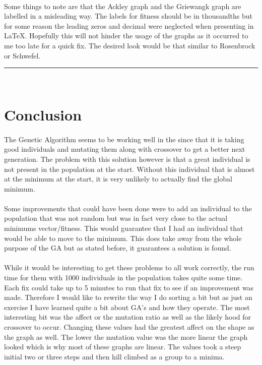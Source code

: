 \documentclass[paper=a4, fontsize=11pt]{scrartcl} %
\numberwithin{equation}{section} %
\numberwithin{figure}{section} %
\numberwithin{table}{section} %
\newcommand{\horrule}[1]{\rule{\linewidth}{#1}} %
\begin{document}
\paragraph{} Some things to note are that the Ackley graph and the Griewangk graph are labelled in a misleading way. The labels for fitness should be in thousandths but for some reason the leading zeros and decimal were neglected when presenting in \LaTeX. Hopefully this will not hinder the usage of the graphs as it occurred to me too late for a quick fix. The desired look would be that similar to Rosenbrock or Schwefel.


\horrule{0.5pt} \\[0.4cm] %
\section{Conclusion}

\paragraph{} The Genetic Algorithm seems to be working well in the since that it is taking good individuals and mutating them along with crossover to get a better next generation. The problem with this solution however is that a great individual is not present in the population at the start. Without this individual that is almost at the minimum at the start, it is very unlikely to actually find the global minimum.

\paragraph{} Some improvements that could have been done were to add an individual to the population that was not random but was in fact very close to the actual minimums vector/fitness. This would guarantee that I had an individual that would be able to move to the minimum. This does take away from the whole purpose of the GA but as stated before, it guarantees a solution is found.

\paragraph{} While it would be interesting to get these problems to all work correctly, the run time for them with 1000 individuals in the population takes quite some time. Each fix could take up to 5 minutes to run that fix to see if an improvement was made. Therefore I would like to rewrite the way I do sorting a bit but as just an exercise I have learned quite a bit about GA's and how they operate. The most interesting bit was the affect or the mutation ratio as well as the likely hood for crossover to occur. Changing these values had the greatest affect on the shape as the graph as well. The lower the mutation value was the more linear the graph looked which is why most of these graphs are linear. The values took a steep initial two or three steps and then hill climbed as a group to a minima.
\end{document}
